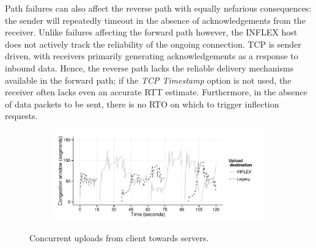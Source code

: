 Path failures can also affect the reverse path with equally nefarious consequences: the sender will repeatedly timeout in the absence of acknowledgements from the receiver.
Unlike failures affecting the forward path however, the INFLEX host does not actively track the reliability of the ongoing connection.
\ac{TCP} is sender driven, with receivers primarily generating acknowledgements as a response to inbound data. 
Hence, the reverse path lacks the reliable delivery mechanisms available in the forward path; if the \emph{\ac{TCP} Timestamp} option is not used, the receiver often lacks even an accurate RTT estimate.
Furthermore, in the absence of data packets to be sent, there is no \ac{RTO} on which to trigger inflection requests.

\begin{figure}
    \begin{subfigure}[b]{1.0\linewidth}
        \centering
        \includegraphics[width=4.5in]{figures/inflex/recv-cwnd.pdf}
    \end{subfigure}
    \caption{Concurrent uploads from client towards servers.\label{fig:receiver}}
\end{figure}

